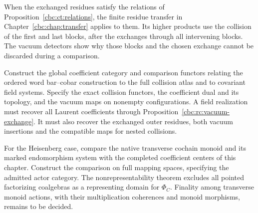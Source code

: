 When the exchanged residues satisfy the relations
of Proposition~\ref{cbc:ct:relations}, the finite residue
transfer in Chapter~\ref{cbc:chap:transfer} applies to them.
Its higher products use
the collision of the first and last blocks,
after the exchanges through all intervening
blocks. The vacuum detectors show why those
blocks and the chosen exchange cannot be
discarded during a comparison.

\begin{problem}\label{cbc:rc:full-reconstruction}
Construct the global coefficient category and
comparison functors relating the ordered word
bar--cobar construction to the full collision
atlas and to covariant field systems.
Specify the exact collision functors, the
coefficient dual and its topology, and the
vacuum maps on nonempty configurations.
A field realization must recover all Laurent coefficients through
Proposition~\ref{cbc:rc:vacuum-exchange}. It must also recover the
exchanged outer residues, both vacuum insertions and the compatible
maps for nested collisions.

For the Heisenberg case, compare the native
transverse cochain monoid and its marked
endomorphism system with the completed
coefficient centers of this chapter.
Construct the comparison on full mapping
spaces, specifying the admitted actor
category. The nonrepresentability theorem
excludes all pointed factorizing coalgebras
as a representing domain for $\Phi_C$.
Finality among transverse monoid actions,
with their multiplication coherences and
monoid morphisms, remains to be decided.
\end{problem}
